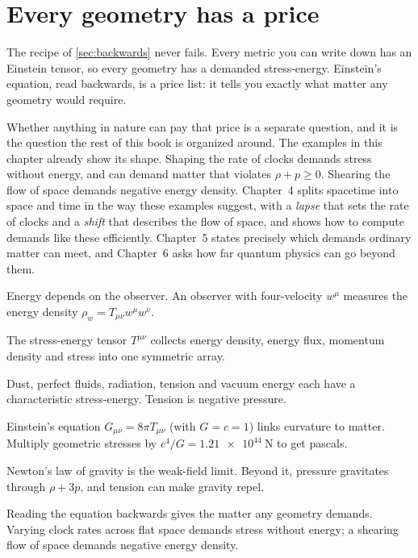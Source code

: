 \section{Every geometry has a price}\label{sec:price}

The recipe of \cref{sec:backwards} never fails. Every metric you can write
down has an Einstein tensor, so every geometry has a demanded stress-energy.
Einstein's equation, read backwards, is a price list: it tells you exactly what
matter any geometry would require.

Whether anything in nature can pay that price is a separate question, and it
is the question the rest of this book is organized around. The examples in this
chapter already show its shape. Shaping the rate of clocks demands stress
without energy, and can demand matter that violates $\rho + p \ge 0$. Shearing
the flow of space demands negative energy density. Chapter~4 splits spacetime
into space and time in the way these examples suggest, with a \emph{lapse} that
sets the rate of clocks and a \emph{shift} that describes the flow of space, and
shows how to compute demands like these efficiently. Chapter~5 states precisely
which demands ordinary matter can meet, and Chapter~6 asks how far quantum
physics can go beyond them.

\begin{chaptersummary}
\item Energy depends on the observer. An observer with four-velocity $w^{\mu}$
  measures the energy density $\rho_{w} = T_{\mu\nu}w^{\mu}w^{\nu}$.
\item The stress-energy tensor $T^{\mu\nu}$ collects energy density, energy
  flux, momentum density and stress into one symmetric array.
\item Dust, perfect fluids, radiation, tension and vacuum energy each have a
  characteristic stress-energy. Tension is negative pressure.
\item Einstein's equation $G_{\mu\nu} = 8\pi T_{\mu\nu}$ (with $G = c = 1$) links
  curvature to matter. Multiply geometric stresses by
  $c^{4}/G = \SI{1.21e44}{\newton}$ to get pascals.
\item Newton's law of gravity is the weak-field limit. Beyond it, pressure
  gravitates through $\rho + 3p$, and tension can make gravity repel.
\item Reading the equation backwards gives the matter any geometry demands.
  Varying clock rates across flat space demands stress without energy; a
  shearing flow of space demands negative energy density.
\end{chaptersummary}

